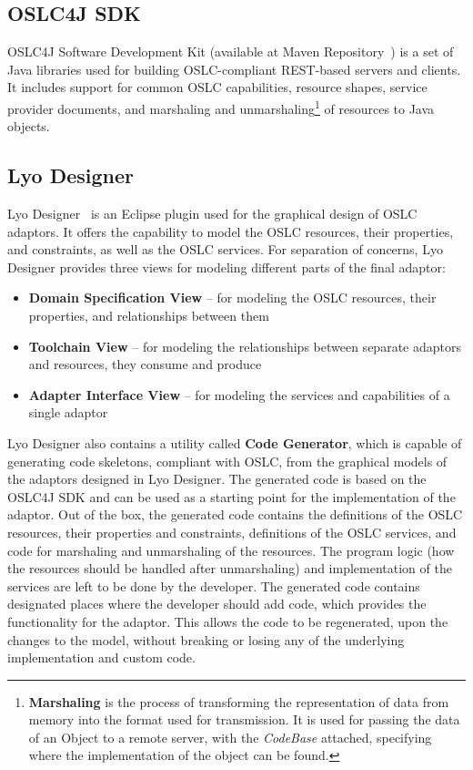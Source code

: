 \subsection*{OSLC4J SDK}
OSLC4J Software Development Kit (available at Maven Repository \cite{maven_oslc4j}) is a set of Java libraries used for building OSLC-compliant REST-based servers and clients. It includes support for common OSLC capabilities, resource shapes, service provider documents, and marshaling and unmarshaling\footnote{\textbf{Marshaling} is the process of transforming the representation of data from memory into the format used for transmission. It is used for passing the data of an Object to a remote server, with the \emph{CodeBase} attached, specifying where the implementation of the object can be found.} of resources to Java objects. 

\subsection*{Lyo Designer}
Lyo Designer \cite{lyo_designer} is an Eclipse plugin used for the graphical design of OSLC adaptors. It offers the capability to model the OSLC resources, their properties, and constraints, as well as the OSLC services. For separation of concerns, Lyo Designer provides three views for modeling different parts of the final adaptor:

\begin{itemize}
  \item \textbf{Domain Specification View} -- for modeling the OSLC resources, their properties, and relationships between them
  \item \textbf{Toolchain View} -- for modeling the relationships between separate adaptors and resources, they consume and produce
  \item \textbf{Adapter Interface View} -- for modeling the services and capabilities of a single adaptor
\end{itemize}

Lyo Designer also contains a utility called \textbf{Code Generator}, which is capable of generating code skeletons, compliant with OSLC, from the graphical models of the adaptors designed in Lyo Designer. The generated code is based on the OSLC4J SDK and can be used as a starting point for the implementation of the adaptor. Out of the box, the generated code contains the definitions of the OSLC resources, their properties and constraints, definitions of the OSLC services, and code for marshaling and unmarshaling of the resources. The program logic (how the resources should be handled after unmarshaling) and implementation of the services are left to be done by the developer. The generated code contains designated places where the developer should add code, which provides the functionality for the adaptor. This allows the code to be regenerated, upon the changes to the model, without breaking or losing any of the underlying implementation and custom code.

